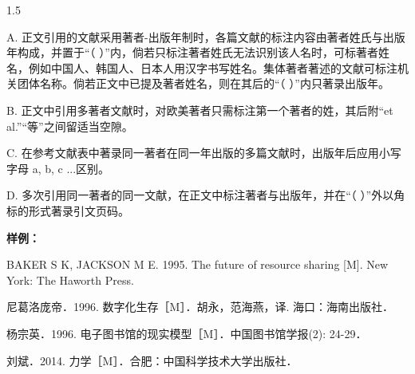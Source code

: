 \documentclass[UTF8, scheme=chinese, openany, oneside]{ctexbook}
\begin{document}
\begin{spacing}{1.5}

\vspace{0.3cm}
\noindent A. 正文引用的文献采用著者-出版年制时，各篇文献的标注内容由著者姓氏与出版年构成，并置于“（ ）”内，倘若只标注著者姓氏无法识别该人名时，可标著者姓名，例如中国人、韩国人、日本人用汉字书写姓名。集体著者著述的文献可标注机关团体名称。倘若正文中已提及著者姓名，则在其后的“（ ）”内只著录出版年。

\vspace{0.3cm}
\noindent B. 正文中引用多著者文献时，对欧美著者只需标注第一个著者的姓，其后附“{\color{blue}et al.}”“等”之间留适当空隙。

\vspace{0.3cm}
\noindent C. 在参考文献表中著录同一著者在同一年出版的多篇文献时，出版年后应用小写字母 a, b, c ...区别。

\vspace{0.3cm}
\noindent D. 多次引用同一著者的同一文献，在正文中标注著者与出版年，并在“（ ）”外以角标的形式著录引文页码。

\vspace{0.5cm}
\noindent \textbf{样例：}

\vspace{0.3cm}
\noindent BAKER S K, JACKSON M E. 1995. The future of resource sharing [M]. New York: The Haworth Press.

\vspace{0.3cm}
\noindent 尼葛洛庞帝．1996. 数字化生存［M］．胡永，范海燕，译. 海口：海南出版社．

\vspace{0.3cm}
\noindent 杨宗英．1996. 电子图书馆的现实模型［M］．中国图书馆学报(2): 24-29．

\vspace{0.3cm}
\noindent 刘斌．2014. 力学［M］．合肥：中国科学技术大学出版社．
\end{spacing}


\clearpage
\thispagestyle{refdoublelinestyle}
\pagestyle{refdoublelinestyle}

\vspace*{3cm}

\vfill
\clearpage
\setcounter{page}{33} %
\end{document}
